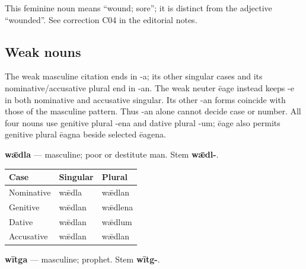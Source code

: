 This feminine noun means “wound; sore”; it is distinct from the adjective “wounded”. See correction C04 in the editorial notes.

\subsection*{Weak nouns}

The weak masculine citation ends in -a; its other singular cases and its nominative/\allowbreak{}accusative plural end in -an. The weak neuter ēage instead keeps -e in both nominative and accusative singular. Its other -an forms coincide with those of the masculine pattern. Thus -an alone cannot decide case or number. All four nouns use genitive plural -ena and dative plural -um; ēage also permits genitive plural ēagna beside selected ēagena.

\textbf{wǣdla} — masculine; poor or destitute man. Stem \textbf{wǣdl-}.

\par\begingroup
\fontsize{10.5}{13.2}\selectfont
\setlength{\LTleft}{0pt}\setlength{\LTright}{\fill}
\noindent
\begin{tabular}{@{}>{\raggedright\arraybackslash}p{39.46mm}>{\raggedright\arraybackslash}p{39.46mm}>{\raggedright\arraybackslash}p{39.46mm}@{}}
\toprule
\textbf{Case} & \textbf{Singular} & \textbf{Plural} \\
\midrule
Nominative & wǣdla & wǣdlan \\
Genitive & wǣdlan & wǣdlena \\
Dative & wǣdlan & wǣdlum \\
Accusative & wǣdlan & wǣdlan \\
\bottomrule
\end{tabular}
\par\endgroup

\textbf{wītga} — masculine; prophet. Stem \textbf{wītg-}.

